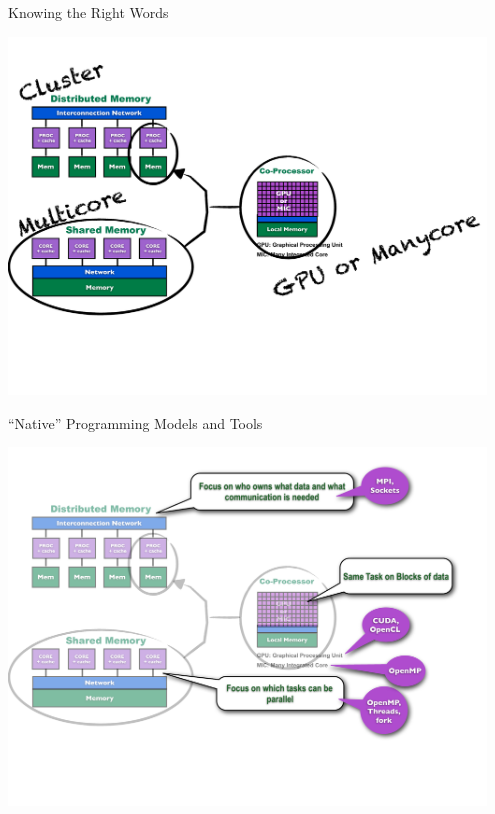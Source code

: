 \begin{frame}
\begin{block}{Knowing the Right Words}
    
\includegraphics[width=0.95\textwidth]
{../common/pics/hardware/ParallelHardware5.pdf}
\end{block}
\end{frame}

\begin{frame}
\begin{block}{``Native'' Programming Models and Tools}
    
\includegraphics[width=0.95\textwidth]
{../common/pics/hardware/ParallelHardware6.pdf}
\end{block}
\end{frame}

